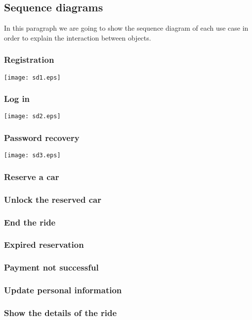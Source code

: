 \pagebreak
\subsection{Sequence diagrams}
In this paragraph we are going to show the sequence diagram of each use case in order to explain the interaction between objects.

\subsubsection{Registration}
	\centerline{
		\texttt{[image: sd1.eps]}}

\subsubsection{Log in}
	\centerline{
		\texttt{[image: sd2.eps]}}

\subsubsection{Password recovery}
	\centerline{
		\texttt{[image: sd3.eps]}}
	
\subsubsection{Reserve a car}
	
\subsubsection{Unlock the reserved car}

\subsubsection{End the ride}

\subsubsection{Expired reservation}

	
\subsubsection{Payment not successful}
	
\subsubsection{Update personal information}
	
\subsubsection{Show the details of the ride}
